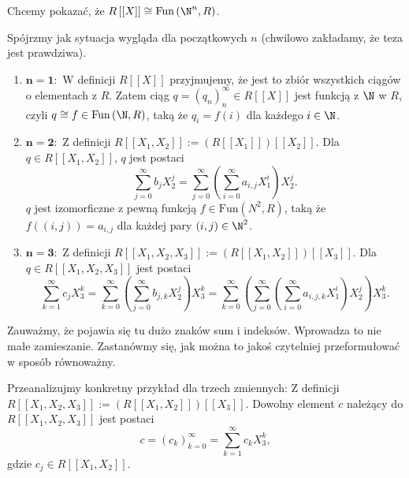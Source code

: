 \begin{intuition}
	\noindent Chcemy pokazać, że $R\left[ \left[ X \right]  \right] \cong \text{Fun}\left( \N^{n}, R \right) $.

	Spójrzmy jak sytuacja wygląda dla początkowych $n$ (chwilowo zakładamy, że teza jest prawdziwa).
	\begin{enumerate}[label=\arabic*)]
		\item $\bm{ n=1: } $ W definicji $R\left[ \left[ X \right]  \right] $ przyjmujemy, że jest to zbiór wszystkich ciągów o elementach z $R$. Zatem ciąg  $q = \left( q_{n} \right)_{n}^{\infty} \in R\left[ \left[ X \right]  \right] $ jest funkcją z $\N$ w $R$, czyli $q \cong f \in \text{Fun}\left( \N, R \right) $, taką że $q_i = f\left( i \right) $ dla każdego  $i \in \N$.
		\item $\bm{ n=2 :} $ Z definicji $R\left[ \left[ X_1,X_2 \right]  \right] := \left( R\left[ \left[ X_1 \right]  \right]  \right) \left[ \left[ X_2 \right]  \right] $. Dla $q \in R\left[ \left[ X_1, X_2 \right]  \right] $, $q$ jest postaci
			\[
			 \sum_{j=0}^{\infty} b_{j}X_{2}^{j} = \sum_{j=0}^{\infty} \left( \sum_{i=0}^{\infty} a_{i,j}X_{1}^{i} \right) X_{2}^{j}
			.\] 
		$q$ jest izomorficzne z pewną funkcją $f\in \text{Fun}\left( N^2 ,R\right) $, taką że $f\left( \left( i,j \right)  \right) = a_{i,j}$ dla każdej pary $\left( i,j \right) \in \N^2$.
		\item $\bm{ n=3: } $ Z definicji $R\left[ \left[X_1, X_2, X_3 \right]  \right] := \left( R\left[ \left[ X_1, X_2 \right]  \right]  \right) \left[ \left[ X_3 \right]  \right] $. Dla $q \in R\left[ \left[ X_1,X_2,X_3 \right]  \right] $ jest postaci
			\[
			\sum_{k=1}^{\infty} c_{j}X_{3}^{k} = \sum_{k=0}^{\infty} \left( \sum_{j=0}^{\infty} b_{j,k}X_{2}^{j} \right) X_{3}^{k} =  \sum_{k=0}^{\infty} \left( \sum_{j=0}^{\infty} \left( \sum_{i=0}^{\infty} a_{i,j,k}X_{1}^{i} \right) X_{2}^{j}  \right) X_{3}^{k} 
			.\] 
	\end{enumerate}

	Zauważmy, że pojawia się tu dużo znaków sum i indeksów. Wprowadza to nie małe zamieszanie. Zastanówmy się, jak można to jakoś czytelniej przeformułować w sposób równoważny. 

\noindent Przeanalizujmy konkretny przykład dla trzech zmiennych:
Z definicji $R\left[ \left[X_1, X_2, X_3 \right]  \right] := \left( R\left[ \left[ X_1, X_2 \right]  \right]  \right) \left[ \left[ X_3 \right]  \right] $. Dowolny element $c$ należący do $R\left[ \left[ X_1,X_2,X_3 \right]  \right] $ jest postaci
			\[
			c = \left( c_{k} \right)_{k=0}^{\infty} = \sum_{k=1}^{\infty} c_{k}X_{3}^{k}
		,\]
		gdzie $c_{j} \in R\left[ \left[ X_1, X_2 \right]  \right] $.
			 

\end{intuition}
